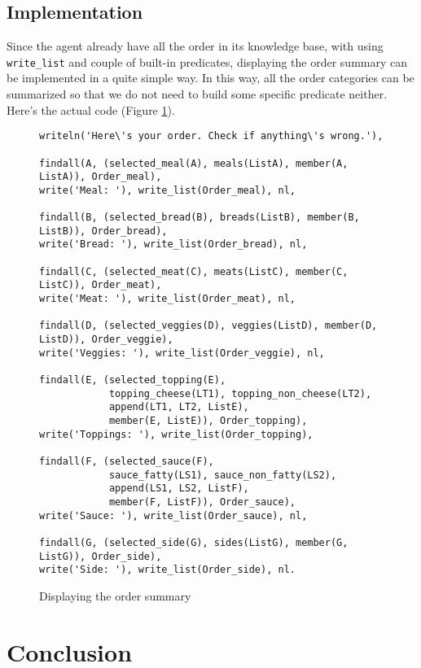 \documentclass[12pt,a4paper]{article}
\newcommand{\varname}[1]{\texttt{#1}}
\newcommand{\predname}[1]{{\color{MidnightBlue}\varname{#1}}}
\begin{document}
\subsection{Implementation}
Since the agent already have all the order in its knowledge base, with using \predname{write\_list} and couple of built-in predicates, displaying the order summary can be implemented in a quite simple way. In this way, all the order categories can be summarized so that we do not need to build some specific predicate neither. Here's the actual code (Figure \ref{fig:display-ex}).

\begin{figure}[H]
	\centering
\begin{lstlisting}[style=Prolog-pygsty]
writeln('Here\'s your order. Check if anything\'s wrong.'),

findall(A, (selected_meal(A), meals(ListA), member(A, ListA)), Order_meal),
write('Meal: '), write_list(Order_meal), nl,
    
findall(B, (selected_bread(B), breads(ListB), member(B, ListB)), Order_bread),
write('Bread: '), write_list(Order_bread), nl,
    
findall(C, (selected_meat(C), meats(ListC), member(C, ListC)), Order_meat),
write('Meat: '), write_list(Order_meat), nl,
    
findall(D, (selected_veggies(D), veggies(ListD), member(D, ListD)), Order_veggie),
write('Veggies: '), write_list(Order_veggie), nl,
    
findall(E, (selected_topping(E),
            topping_cheese(LT1), topping_non_cheese(LT2),
            append(LT1, LT2, ListE),
            member(E, ListE)), Order_topping),
write('Toppings: '), write_list(Order_topping),
   
findall(F, (selected_sauce(F),
            sauce_fatty(LS1), sauce_non_fatty(LS2),
            append(LS1, LS2, ListF),
            member(F, ListF)), Order_sauce),
write('Sauce: '), write_list(Order_sauce), nl,
    
findall(G, (selected_side(G), sides(ListG), member(G, ListG)), Order_side),
write('Side: '), write_list(Order_side), nl.
\end{lstlisting}
	\caption{Displaying the order summary} 
	\label{fig:display-ex}
\end{figure}

\section{Conclusion}
\label{sec:conc}
\end{document}

